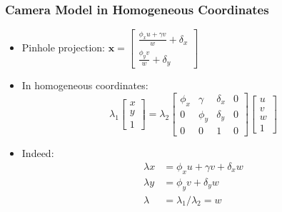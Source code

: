 \documentclass{beamer}
\begin{document}
\begin{frame}
  \frametitle{Camera Model in Homogeneous Coordinates}
  \begin{itemize}[<+->]
    \item Pinhole projection: $\mathbf{x} = \begin{bmatrix}
        \frac{\phi_x u + \gamma v}{w}+\delta_x \\
        \frac{\phi_y v}{w}+\delta_y
      \end{bmatrix}$
    \item In homogeneous coordinates: \begin{equation*}
      \lambda_1 \begin{bmatrix}
        x \\ y \\ 1
      \end{bmatrix} =
      \lambda_2
      \begin{bmatrix}
        \phi_x & \gamma & \delta_x & 0 \\
        0 & \phi_y & \delta_y & 0 \\
        0 & 0 & 1 & 0
      \end{bmatrix} \begin{bmatrix}
        u \\ v \\ w \\ 1
      \end{bmatrix}
      \end{equation*}
    \item Indeed:
      \begin{align*}
        \lambda x &= \phi_x u + \gamma v + \delta_x w \\
        \lambda y &= \phi_y v + \delta_y w \\
        \lambda &= \lambda_1 / \lambda_2 = w
      \end{align*}
  \end{itemize}
\end{frame}
\end{document}
